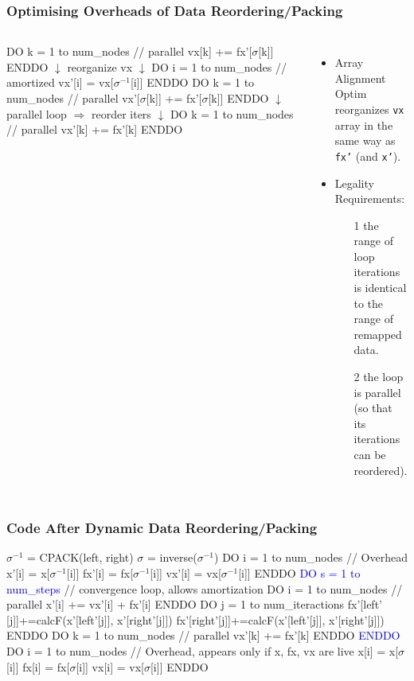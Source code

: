 \documentclass{beamer}
\newcommand{\blue}[1]{\textcolor{Blue}{{#1}}}
\newcommand{\emp}[1]{\textcolor{DikuRed}{ #1}}
\newcommand{\emphh}[1]{\textcolor{CosGreen}{ #1}}
\newcommand{\mymath}[1]{$ #1 $}
\newcommand{\myindu}[1]{^{#1}}
\begin{document}
\begin{frame}[fragile,t]
  \frametitle{Optimising Overheads of Data Reordering/Packing}

\begin{columns}
\begin{colorcode}
DO k = 1 to num_nodes // parallel
  \emphh{vx[k]} += \alert{fx'[\mymath{\sigma}[k]]}
ENDDO
    \mymath{\downarrow} reorganize vx \mymath{\downarrow}
DO i = 1 to num_nodes // amortized
  vx'[i] = vx[\mymath{\sigma\myindu{-1}}[i]]
ENDDO
DO k = 1 to num_nodes // parallel
  \alert{vx'[\mymath{\sigma}[k]]} += \alert{fx'[\mymath{\sigma}[k]]}
ENDDO
    \mymath{\downarrow} parallel loop \mymath{\Rightarrow} reorder iters \mymath{\downarrow}
DO k = 1 to num_nodes // parallel
  \emphh{vx'[k]} += \emphh{fx'[k]}
ENDDO
\end{colorcode}
\begin{itemize}
    \item \emp{Array Alignment Optim} reorganizes {\tt vx}
            array in the same way as {\tt fx'} (and {\tt x'}).
    \item Legality Requirements:
        \begin{itemize}
            \item[1] the range of loop iterations is identical to
                        the range of remapped data.
            \item[2] the loop is parallel (so that its iterations can be reordered).
        \end{itemize}
\end  {itemize} 
\end{columns}

\end{frame}


\begin{frame}[fragile,t]
  \frametitle{Code After Dynamic Data Reordering/Packing}

\begin{colorcode}
\emp{\mymath{\sigma\myindu{-1}} = CPACK(left, right)}
\emp{\mymath{\sigma} = inverse(\mymath{\sigma\myindu{-1}})}
\emp{DO i = 1 to num_nodes // Overhead}
   x'[i] =  x[\mymath{\sigma\myindu{-1}}[i]]
  fx'[i] = fx[\mymath{\sigma\myindu{-1}}[i]]
  vx'[i] = vx[\mymath{\sigma\myindu{-1}}[i]]
\emp{ENDDO}
\blue{DO s = 1 to num_steps} // convergence loop, allows amortization
  DO i = 1 to num_nodes  // parallel
    \emphh{x'[i] += vx'[i] + fx'[i]}
  ENDDO
  DO j = 1 to num_iteractions
    \emphh{fx'[left' [j]]+=calcF(x'[left'[j]], x'[right'[j]])}
    \emphh{fx'[right'[j]]+=calcF(x'[left'[j]], x'[right'[j]])}
  ENDDO
  DO k = 1 to num_nodes // parallel
    \emphh{vx'[k] += fx'[k]}
  ENDDO
\blue{ENDDO}
\emp{DO i = 1 to num_nodes // Overhead}, appears only if x, fx, vx are live
   x[i] =  x[\mymath{\sigma}[i]]
  fx[i] = fx[\mymath{\sigma}[i]]
  vx[i] = vx[\mymath{\sigma}[i]]
\emp{ENDDO}
\end{colorcode}
\end{frame}
\end{document}
